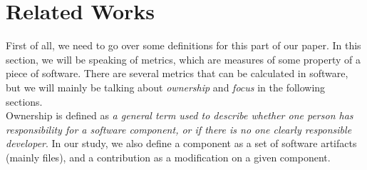\section{Related Works}

First of all, we need to go over some definitions for this part of our paper. In this section, we will be speaking of metrics, which are measures of some property of a piece of software. There are several metrics that can be calculated in software, but we will mainly be talking about \emph{ownership} and \emph{focus} in the following sections.\\
Ownership is defined as \emph{a general term used to describe whether one person has responsibility for a software component, or if there is no one clearly responsible developer}\cite{DontTouchMyCode}. In our study, we also define a component as a set of software artifacts (mainly files), and a contribution as a modification on a given component.




